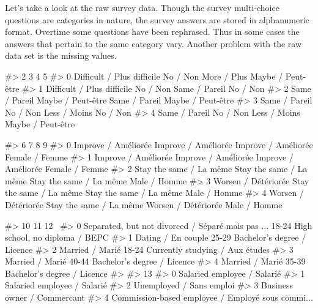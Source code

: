 Let's take a look at the raw survey data. Though the survey multi-choice
questions are categories in nature, the survey answers are stored in
alphanumeric format. Overtime some questions have been rephrased. Thus
in some cases the answers that pertain to the same category vary.
Another problem with the raw data set is the missing values.

\begin{Schunk}
\begin{Soutput}
#>                             2                  3              4                  5
#> 0  Difficult / Plus difficile           No / Non    More / Plus  Maybe / Peut-être
#> 1  Difficult / Plus difficile           No / Non  Same / Pareil           No / Non
#> 2               Same / Pareil  Maybe / Peut-être  Same / Pareil  Maybe / Peut-être
#> 3               Same / Pareil           No / Non   Less / Moins           No / Non
#> 4               Same / Pareil           No / Non   Less / Moins  Maybe / Peut-être
\end{Soutput}
\begin{Soutput}
#>                          6                        7                        8               9
#> 0      Improve / Améliorée      Improve / Améliorée      Improve / Améliorée  Female / Femme
#> 1      Improve / Améliorée      Improve / Améliorée      Improve / Améliorée  Female / Femme
#> 2  Stay the same / La même  Stay the same / La même  Stay the same / La même    Male / Homme
#> 3      Worsen / Détériorée  Stay the same / La même  Stay the same / La même    Male / Homme
#> 4      Worsen / Détériorée  Stay the same / La même      Worsen / Détériorée    Male / Homme
\end{Soutput}
\begin{Soutput}
#>                                                   10     11                               12  \
#> 0  Separated, but not divorced / Séparé mais pas ...  18-24   High school, no diploma / BEPC   
#> 1                                 Dating / En couple  25-29      Bachelor’s degree / Licence   
#> 2                                    Married / Marié  18-24  Currently studying / Aux études   
#> 3                                    Married / Marié  40-44      Bachelor’s degree / Licence   
#> 4                                    Married / Marié  35-39      Bachelor’s degree / Licence   
#> 
#>                                                   13  
#> 0                        Salaried employee / Salarié  
#> 1                        Salaried employee / Salarié  
#> 2                           Unemployed / Sans emploi  
#> 3                        Business owner / Commercant  
#> 4  Commission-based employee / Employé sous commi...
\end{Soutput}
\end{Schunk}

